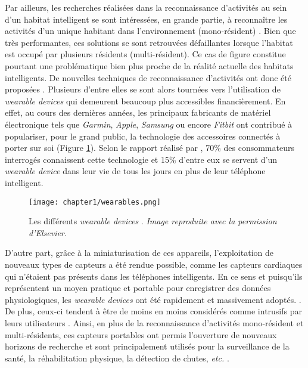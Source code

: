 {{Par ailleurs, les recherches réalisées dans la reconnaissance d'activités au sein d'un habitat intelligent se sont intéressées, en grande partie, à reconnaître les activités d'un unique habitant dans l'environnement (mono-résident) \citep{VikramadityaJakkula2007, VanKasteren2008, Inomata2009, Ghazvininejad2011, Belley2014, Fortin-Simard2015}. Bien que très performantes, ces solutions se sont retrouvées défaillantes lorsque l'habitat est occupé par plusieurs résidents (multi-résident). Ce cas de figure constitue pourtant une problématique bien plus proche de la réalité actuelle des habitats intelligents. De nouvelles techniques de reconnaissance d'activités ont donc été proposées \citep{Crandall2009, Cook2009, Alemdar2013, Ayuningtyas2014, Emi2015, Mokhtari2018}. Plusieurs d'entre elles \citep{Mihailidis2004, Tunca2014} se sont alors tournées vers l'utilisation de \textit{wearable devices} qui demeurent beaucoup plus accessibles financièrement. En effet, au cours des dernières années, les principaux fabricants de matériel électronique tels que \textit{Garmin}, \textit{Apple}, \textit{Samsung} ou encore \textit{Fitbit} ont contribué à populariser, pour le grand public, la technologie des accessoires connectés à porter sur soi (Figure \ref{fig:wearables}). Selon le rapport réalisé par \cite{Nielsen2014}, 70\% des consommateurs interrogés connaissent cette technologie et 15\% d'entre eux se servent d'un \textit{wearable device} dans leur vie de tous les jours en plus de leur téléphone intelligent.

\begin{figure}[H]
	\centering
	\texttt{[image: chapter1/wearables.png]}
	\caption[Les différents \textit{wearable devices}.]{Les différents \textit{wearable devices} \citep{Huifeng2020}. \textit{Image reproduite avec la permission d’Elsevier.}}
	\label{fig:wearables}
\end{figure}

D'autre part, grâce à la miniaturisation de ces appareils, l'exploitation de nouveaux types de capteurs a été rendue possible, comme les capteurs cardiaques qui n'étaient pas présents dans les téléphones intelligents. En ce sens et puisqu'ils représentent un moyen pratique et portable pour enregistrer des données physiologiques, les \textit{wearable devices} ont été rapidement et massivement adoptés. \citep{NPDGroup2015}. De plus, ceux-ci tendent à être de moins en moins considérés comme intrusifs par leurs utilisateurs \citep{Gaskin2017}. Ainsi, en plus de la reconnaissance d'activités mono-résident et multi-résidents, ces capteurs portables ont permis l'ouverture de nouveaux horizons de recherche et sont principalement utilisés pour la surveillance de la santé, la réhabilitation physique, la détection de chutes, \textit{etc.} \citep{Patel2012, Mukhopadhyay2014, Delahoz2014}.

}}
